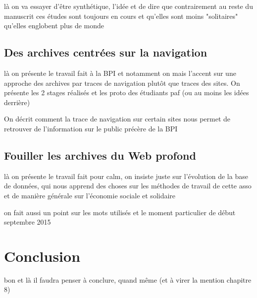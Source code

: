 \documentclass[symmetric,justified,marginals=raggedouter]{tufte-book}
\begin{document}
\noindent là on va essayer d'être synthétique, l'idée et de dire que contrairement au reste du manuscrit ces études sont toujours en cours et qu'elles sont moins "solitaires" qu'elles englobent plus de monde 

\section{Des archives centrées sur la navigation}

\noindent là on présente le travail fait à la BPI et notamment on mais l'accent sur une approche des archives par traces de navigation plutôt que traces des sites. On présente les 2 stages réalisés et les proto des étudiants paf (ou au moins les idées derrière) 

\noindent On décrit comment la trace de navigation sur certain sites nous permet de retrouver de l'information sur le public précère de la BPI

\section{Fouiller les archives du Web profond}

\noindent là on présente le travail fait pour calm, on insiste juste sur l'évolution de la base de données, qui nous apprend des choses sur les méthodes de travail de cette asso et de manière générale sur l'économie sociale et solidaire

\noindent on fait aussi un point sur les mots utilisés et le moment particulier de début septembre 2015 


\chapter{Conclusion}

\noindent bon et là il faudra penser à conclure, quand même (et à virer la mention chapitre 8)









\backmatter





\printindex
\end{document}
